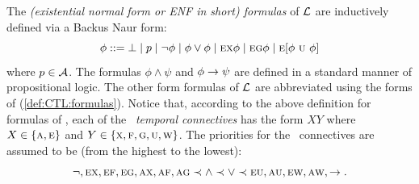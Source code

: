 \documentclass[letterpaper]{article} %
\begin{document}
The {\em (existential normal form or ENF in short) formulas} of
$\cal L$ are inductively defined via a Backus Naur form:
\begin{equation}\label{def:CTL:formulas}
  \phi ::= \bot\mid p \mid\neg\phi \mid \phi\lor\phi \mid
    \EXIST \NEXT \phi \mid
    \EXIST \GLOBAL \phi \mid
    \EXIST [\phi\ \UNTIL\ \phi]%
\end{equation}
where $p\in\cal A$. The formulas $\phi\land\psi$ and $\phi\rightarrow\psi$
are defined in a standard manner of propositional logic.
The other form formulas of $\cal L$ are abbreviated
using the forms of (\ref{def:CTL:formulas}).
Notice that, according to the
above definition for formulas of \CTL,
each of the \CTL\ {\em temporal connectives} has the form $XY$
where $X\in \{\textsc{a},\textsc{e}\}$ and  $Y\in\{\textsc{x}, \textsc{f}, \textsc{g}, \textsc{u}, \textsc{w}\}$.
The priorities for the \CTL\ connectives are assumed to be (from the highest to the lowest):
\begin{equation*}
  \neg, \textsc{e}\textsc{x}, \textsc{e}\textsc{f}, \textsc{e}\textsc{g}, \textsc{a}\textsc{x}, \textsc{a}\textsc{f}, \textsc{a}\textsc{g}
  \prec \land \prec \lor \prec \textsc{e}\textsc{u}, \textsc{a}\textsc{u}, \textsc{e} \textsc{w}, \textsc{a} \textsc{w}, \rightarrow.
\end{equation*}
\end{document}
